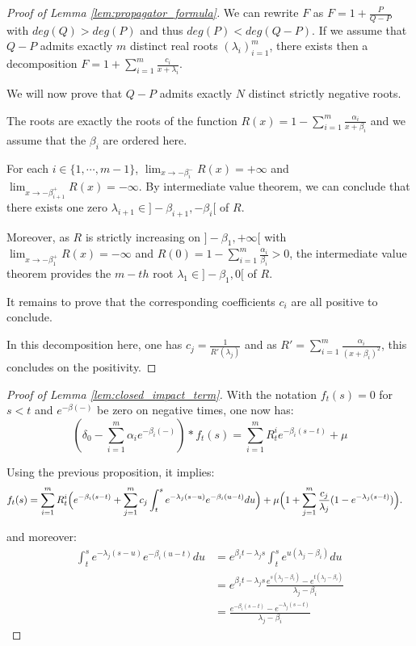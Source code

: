 \documentclass{article} %
\newcommand{\1}{\mathbbm{1}} %
\begin{document}
\begin{as}
\begin{proof}[Proof of Lemma \ref{lem:propagator_formula}]
    We can rewrite $F$ as $F = 1 + \frac{P}{Q-P}$ with $deg(Q) > deg(P)$ and thus $deg(P) < deg(Q-P)$. 
    If we assume that $Q-P$ admits exactly $m$ distinct real roots $(\lambda_i)_{i=1}^m$, there exists then a decomposition $F = 1 + \sum_{i=1}^m \frac{c_i}{x + \lambda_i}$.
    
    We will now prove that $Q-P$ admits exactly $N$ distinct strictly negative roots.
    
    The roots are exactly the roots of the function $R(x) = 1 - \sum_{i=1}^{m} \frac{\alpha_i}{x+\beta_i}$ and we assume that the $\beta_i$ are ordered here.
    
    For each $i \in \{1,\cdots,m-1\}$, $\lim_{x \to -\beta_i^-}R(x) = +\infty$ and $\lim_{x \to -\beta_{i+1}^+} R(x) = -\infty$. By intermediate value theorem, we can conclude that there exists one zero $\lambda_{i+1} \in ]-\beta_{i+1}, -\beta_i[$ of $R$.
    
    Moreover, as $R$ is strictly increasing on $]-\beta_1, +\infty[$ with $\lim_{x \to -\beta_1^+}R(x) = -\infty$ and $R(0) = 1 - \sum_{i=1}^m \frac{\alpha_i}{\beta_i} > 0$, the intermediate value theorem provides the $m-th$ root $\lambda_1 \in ]-\beta_1, 0[$ of $R$.
    
    It remains to prove that the corresponding coefficients $c_i$ are all positive to conclude.
    
    In this decomposition here, one has $c_j = \frac{1}{R'(\lambda_j)}$ and as $R' = \sum_{i=1}^m \frac{\alpha_i}{(x+\beta_i)^2}$, this concludes on the positivity.
\end{proof}

\begin{proof}[Proof of Lemma \ref{lem:closed_impact_term}]
    With the notation $f_t(s) = 0$ for $s<t$ and $e^{-\beta (-)}$ be zero on negative times, one now has:
    $$(\delta_0 - \sum_{i=1}^m \alpha_i e^{-\beta_i (-)}) \ast f_t(s) = \sum_{i=1}^m R^i_t e^{-\beta_i(s-t)} + \mu$$

    
    Using the previous proposition, it implies:
    \begin{align*}
        f_t(s) &= \sum_{i=1}^m R^i_t \Bigl( e^{-\beta_i(s-t)} + \sum_{j=1}^m c_j \int_t^s e^{-\lambda_j (s-u)} e^{-\beta_i (u-t)} du \Bigr) + \mu \Bigl( 1  + \sum_{j=1}^m \frac{c_j}{\lambda_j}(1 - e^{-\lambda_j (s-t)})\Bigr).
    \end{align*}

    and moreover:
    \begin{align*}
    \int_t^s e^{-\lambda_j(s-u)} e^{-\beta_i(u-t)} du &= e^{\beta_i t - \lambda_j s} \int_t^s e^{u(\lambda_j - \beta_i)} du \\
    &= e^{\beta_i t - \lambda_j s} \frac{e^{s(\lambda_j - \beta_i)} - e^{t(\lambda_j - \beta_i)}}{\lambda_j - \beta_i} \\
    &= \frac{e^{-\beta_i (s-t)} - e^{-\lambda_j(s-t)}}{\lambda_j - \beta_i}
    \end{align*}
    

\end{proof}
\end{as}
\end{document}
